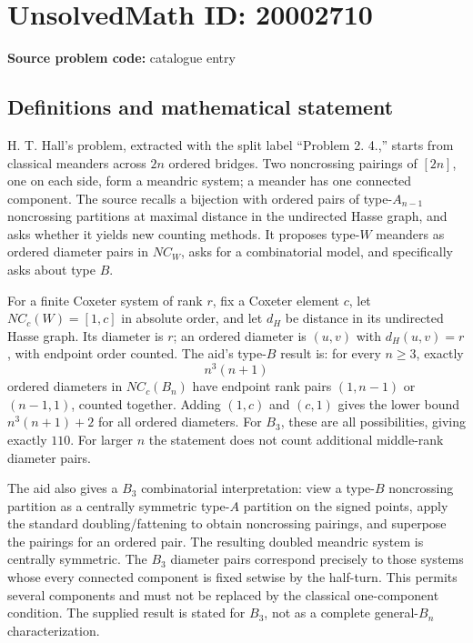 \documentclass[11pt]{article}
\begin{document}
\section*{UnsolvedMath ID: 20002710}
\textbf{Source problem code:} catalogue entry
\subsection{Definitions and mathematical statement}
H. T. Hall's problem, extracted with the split label ``Problem 2. 4.,'' starts from classical meanders across $2n$ ordered bridges. Two noncrossing pairings of $[2n]$, one on each side, form a meandric system; a meander has one connected component. The source recalls a bijection with ordered pairs of type-$A_{n-1}$ noncrossing partitions at maximal distance in the undirected Hasse graph, and asks whether it yields new counting methods. It proposes type-$W$ meanders as ordered diameter pairs in $NC_W$, asks for a combinatorial model, and specifically asks about type $B$.

For a finite Coxeter system of rank $r$, fix a Coxeter element $c$, let $NC_c(W)=[1,c]$ in absolute order, and let $d_H$ be distance in its undirected Hasse graph. Its diameter is $r$; an ordered diameter is $(u,v)$ with $d_H(u,v)=r$, with endpoint order counted. The aid's type-$B$ result is: for every $n\geq3$, exactly
\[
n^3(n+1)
\]
ordered diameters in $NC_c(B_n)$ have endpoint rank pairs $(1,n-1)$ or $(n-1,1)$, counted together. Adding $(1,c)$ and $(c,1)$ gives the lower bound $n^3(n+1)+2$ for all ordered diameters. For $B_3$, these are all possibilities, giving exactly $110$. For larger $n$ the statement does not count additional middle-rank diameter pairs.

The aid also gives a $B_3$ combinatorial interpretation: view a type-$B$ noncrossing partition as a centrally symmetric type-$A$ partition on the signed points, apply the standard doubling/fattening to obtain noncrossing pairings, and superpose the pairings for an ordered pair. The resulting doubled meandric system is centrally symmetric. The $B_3$ diameter pairs correspond precisely to those systems whose every connected component is fixed setwise by the half-turn. This permits several components and must not be replaced by the classical one-component condition. The supplied result is stated for $B_3$, not as a complete general-$B_n$ characterization.
\end{document}
